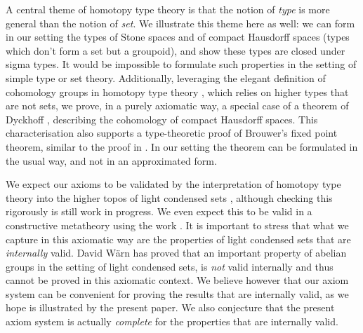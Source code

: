 A central theme of homotopy type theory is that the notion of {\em type} is more general than the notion of {\em set}. We illustrate
this theme here as well: we can form in our setting the types of Stone spaces and of compact Hausdorff spaces
(types which don't form a set but a groupoid),
and show these types are
closed under sigma types. It would be impossible to formulate such properties in the setting of simple type or set theory.
Additionally, leveraging the elegant definition of cohomology groups in homotopy type theory \cite{hott}, which relies
on higher types that are not sets, we prove, in a purely axiomatic way,
a special case of a theorem of Dyckhoff \cite{dyckhoff76}, describing
the cohomology of compact Hausdorff spaces. This characterisation also supports a type-theoretic proof of
Brouwer's fixed point theorem, similar to the proof in \cite{shulman-Brouwer-fixed-point}. In our setting the theorem can be formulated in the usual way, and not in an approximated form.

We expect our axioms to be validated by the interpretation of homotopy type theory into the higher topos of light condensed sets \cite{shulman2019all}, although checking this rigorously is still work in progress. We even expect this to be valid in a constructive metatheory
using the work \cite{CRS21}. It is important to stress that what we capture in this axiomatic way are the properties of light condensed
sets that are {\em internally} valid. David W\"arn \cite{warn2024} has proved that an important property of abelian
groups in the setting of light condensed sets, is {\em not} valid internally and thus cannot be proved in this axiomatic context.
We believe however that our axiom system can be convenient for proving the results that are internally valid, as we hope
is illustrated by the present paper. We also conjecture that the present axiom system is actually {\em complete}
for the properties that are internally valid.
